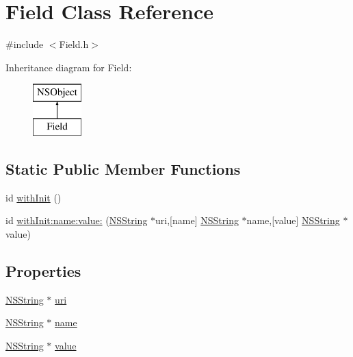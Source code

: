 \hypertarget{interface_field}{
\section{\-Field \-Class \-Reference}
\label{interface_field}
}


{\ttfamily \#include $<$\-Field.\-h$>$}

\-Inheritance diagram for \-Field\-:\begin{figure}[H]
\begin{center}
\leavevmode
\includegraphics[height=2.000000cm]{interface_field}
\end{center}
\end{figure}
\subsection*{\-Static \-Public \-Member \-Functions}
\begin{DoxyCompactItemize}
\item 
id \hyperlink{interface_field_aa0306035117ddda530bd62ca75f55011}{with\-Init} ()
\item 
id \hyperlink{interface_field_a2ee6f2119b80ab20893f438dfa1893bb}{with\-Init\-:name\-:value\-:} (\hyperlink{class_n_s_string}{\-N\-S\-String} $\ast$uri,\mbox{[}name\mbox{]} \hyperlink{class_n_s_string}{\-N\-S\-String} $\ast$name,\mbox{[}value\mbox{]} \hyperlink{class_n_s_string}{\-N\-S\-String} $\ast$value)
\end{DoxyCompactItemize}
\subsection*{\-Properties}
\begin{DoxyCompactItemize}
\item 
\hyperlink{class_n_s_string}{\-N\-S\-String} $\ast$ \hyperlink{interface_field_a5f4eb4c4b330ca322fe03ad691c9aa2e}{uri}
\item 
\hyperlink{class_n_s_string}{\-N\-S\-String} $\ast$ \hyperlink{interface_field_ae019697dbae6077ad6f11e2b8aa32b7a}{name}
\item 
\hyperlink{class_n_s_string}{\-N\-S\-String} $\ast$ \hyperlink{interface_field_a2e6db10b66c8a1586a6cf24847434456}{value}
\end{DoxyCompactItemize}


